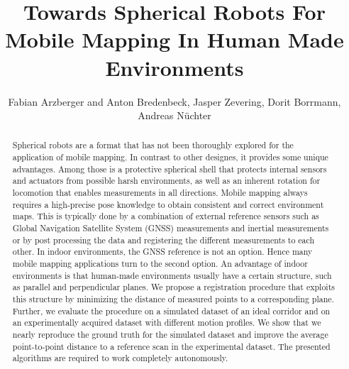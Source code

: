 \documentclass[5p]{elsarticle}
\begin{document}
\begin{frontmatter}

\title{Towards Spherical Robots For Mobile Mapping In Human Made Environments}

\author{Fabian Arzberger and Anton Bredenbeck, Jasper Zevering, Dorit Borrmann, Andreas Nüchter}
\address{Informatics VII: Robotics and Telematics,
Julius-Maximilians-University Würzburg, Germany\\
e-mail: dorit.borrmann@uni-wuerzburg.de}




\begin{abstract}
Spherical robots are a format that has not been thoroughly explored for the application of mobile mapping. 
In contrast to other designes, it provides some unique advantages. 
Among those is a protective spherical shell that protects internal sensors and actuators from possible harsh environments, as well as an inherent rotation for locomotion that enables measurements in all directions.
Mobile mapping always requires a high-precise pose knowledge to obtain consistent and correct environment maps. 
This is typically done by a combination of external reference sensors such as Global Navigation Satellite System (GNSS) measurements and inertial measurements or by post processing the data and registering the different measurements to each other. 
In indoor environments, the GNSS reference is not an option.
Hence many mobile mapping applications turn to the second option.
An advantage of indoor environments is that human-made environments usually have a certain structure, such as parallel and perpendicular planes.
We propose a registration procedure that exploits this structure by minimizing the distance of measured points to a corresponding plane. 
Further, we evaluate the procedure on a simulated dataset of an ideal corridor and on an experimentally acquired dataset with different motion profiles. 
We show that we nearly reproduce the ground truth for the simulated dataset and improve the average point-to-point distance to a reference scan in the experimental dataset.
The presented algorithms are required to work completely autonomously.
\end{abstract}


\end{frontmatter}
\end{document}
